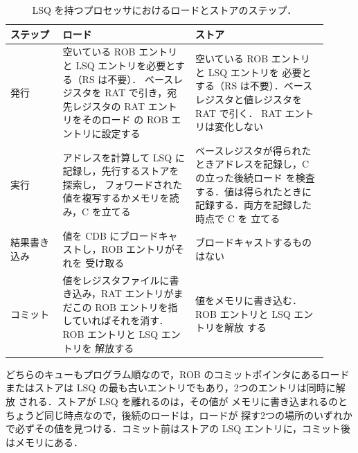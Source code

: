 \documentclass[../main.tex]{subfiles}
\begin{document}
\begin{table}[htbp]
  \centering\small
  \caption{LSQ を持つプロセッサにおけるロードとストアのステップ．}
  \label{tab:l09-steps}
  \begin{tabular}{@{}>{\raggedright\arraybackslash}p{0.15\linewidth}>{\raggedright\arraybackslash}p{0.38\linewidth}>{\raggedright\arraybackslash}p{0.38\linewidth}@{}}
    \toprule
    ステップ & ロード & ストア \\
    \midrule
    発行 & 空いている ROB エントリと LSQ エントリを必要とする（RS は不要）．
      ベースレジスタを RAT で引き，宛先レジスタの RAT エントリをそのロード
      の ROB エントリに設定する & 空いている ROB エントリと LSQ エントリを
      必要とする（RS は不要）．ベースレジスタと値レジスタを RAT で引く．
      RAT エントリは変化しない \\
    \addlinespace
    実行 & アドレスを計算して LSQ に記録し，先行するストアを探索し，
      フォワードされた値を複写するかメモリを読み，C を立てる
      & ベースレジスタが得られたときアドレスを記録し，C の立った後続ロード
      を検査する．値は得られたときに記録する．両方を記録した時点で C を
      立てる \\
    \addlinespace
    結果書き込み & 値を CDB にブロードキャストし，ROB エントリがそれを
      受け取る & ブロードキャストするものはない \\
    \addlinespace
    コミット & 値をレジスタファイルに書き込み，RAT エントリがまだこの ROB
      エントリを指していればそれを消す．ROB エントリと LSQ エントリを
      解放する & 値をメモリに書き込む．ROB エントリと LSQ エントリを解放
      する \\
    \bottomrule
  \end{tabular}
\end{table}

どちらのキューもプログラム順なので，ROB のコミットポインタにあるロード
またはストアは LSQ の最も古いエントリでもあり，2つのエントリは同時に解放
される．ストアが LSQ を離れるのは，その値が
メモリに書き込まれるのとちょうど同じ時点なので，後続のロードは，ロードが
探す2つの場所のいずれかで必ずその値を見つける．コミット前はストアの LSQ
エントリに，コミット後はメモリにある．
\end{document}
